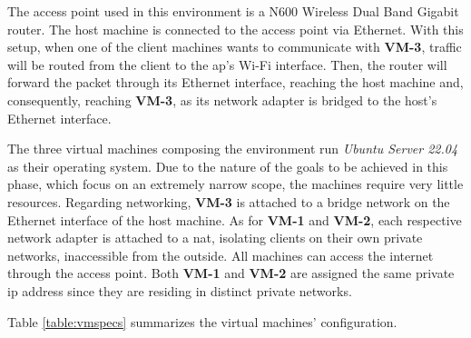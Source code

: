 \documentclass[11pt,twoside,a4paper]{report}
\begin{document}
The access point used in this environment is a N600 Wireless Dual Band Gigabit router. The host machine is connected to the access point via Ethernet. With this setup, when one of the client machines wants to communicate with \textbf{VM-3}, traffic will be routed from the client to the \ac{ap}'s Wi-Fi interface. Then, the router will forward the packet through its Ethernet interface, reaching the host machine and, consequently, reaching \textbf{VM-3}, as its network adapter is bridged to the host's Ethernet interface.

The three virtual machines composing the environment run \emph{Ubuntu Server 22.04} as their operating system. Due to the nature of the goals to be achieved in this phase, which focus on an extremely narrow scope, the machines require very little resources. Regarding networking, \textbf{VM-3} is attached to a bridge network on the Ethernet interface of the host machine. As for \textbf{VM-1} and \textbf{VM-2}, each respective network adapter is attached to a \ac{nat}, isolating clients on their own private networks, inaccessible from the outside. All machines can access the internet through the access point. Both \textbf{VM-1} and \textbf{VM-2} are assigned the same private \ac{ip} address since they are residing in distinct private networks.

Table \ref{table:vmspecs} summarizes the virtual machines' configuration.

\begin{table}[]
\centering
{}
\caption{Development Virtual Machines specification}
\label{table:vmspecs}
\end{table}
\end{document}
